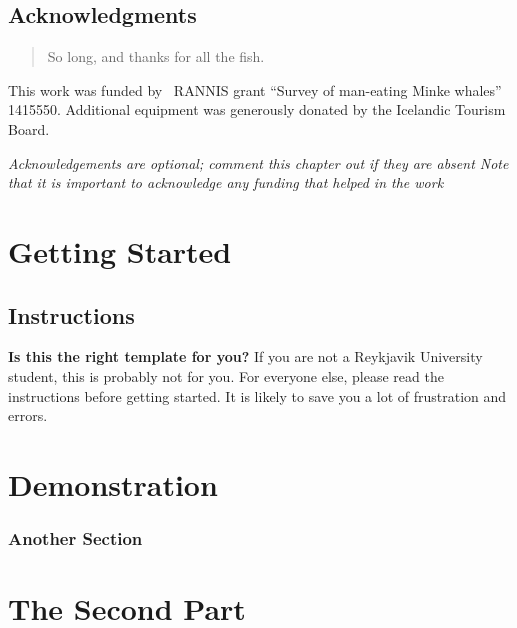 \documentclass[12pt, a4paper]{memoir}
\begin{document}
\chapter*{Acknowledgments} 
\begin{quotation}
So long, and thanks for all the fish.
\end{quotation}
\vspace{\baselineskip}

This work was funded by \the\year~RANNIS grant ``Survey of man-eating Minke whales'' 1415550.
Additional equipment was generously donated by the Icelandic Tourism Board.

{\em Acknowledgements are optional; comment this chapter out if they are absent
  Note that it is important to acknowledge any funding that helped in the work\/}
\clearpage{}

\mainmatter{}

\part{Getting Started} %
\chapter{Instructions}
\textbf{Is this the right template for you?}
If you are not a Reykjavik University student, this is probably not for you.
For everyone else, please read the instructions before getting started.
It is likely to save you a lot of frustration and errors.
\part{Demonstration}
\section{Another Section}
\part{The Second Part} %

\printbibliography{}

\appendix{}%


\clearforchapter{}
\printindex{}%
\end{document}

